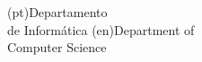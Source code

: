 



\ntdepartment(pt){Departamento\\de Informática}
\ntdepartment(en){Department of\\Computer Science}


